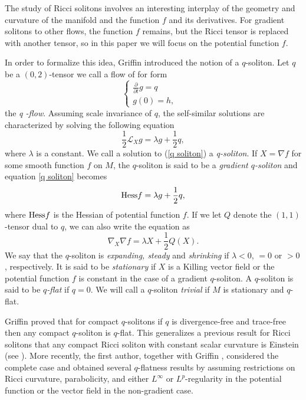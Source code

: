 \documentclass{amsart}
\theoremstyle{plain}
\numberwithin{equation}{section}
\begin{document}
The study of Ricci solitons involves an interesting interplay of the geometry and curvature of the manifold and the function $f$ and its derivatives.  For gradient solitons to other flows, the function $f$ remains, but the Ricci tensor is replaced with another tensor, so in this paper we will focus on the potential function $f$.  

In order to formalize this idea,  Griffin \cite{Griffin} introduced the notion of a $q$-soliton.   Let $q$ be a $(0,2)$-tensor we call a flow of for form
\begin{equation}\label{q flow}
\left\{%
\begin{array}{ll}
\frac{\partial}{\partial t}g=q & \\
g(0)=h,
\end{array}%
\right.
\end{equation}
the {\emph{q -flow}}. Assuming scale invariance of $q$, the self-similar solutions  are characterized by solving the following equation
\begin{equation}\label{q soliton}
\frac{1}{2}\mathcal{L}_Xg=\lambda g+\frac{1}{2}q,
\end{equation}
where $\lambda$ is a constant. We call a solution to (\ref{q soliton}) a \emph{q-soliton}.  If $X=\nabla f$ for some smooth function $f$ on $M$, the $q$-soliton is said to be a {\em gradient $q$-soliton} and equation \eqref{q soliton} becomes
\begin{equation}\label{grad q soliton}
{\rm Hess} f=\lambda g+\frac{1}{2}q,
\end{equation}
where ${\rm Hess} f$ is the Hessian of  potential function $f$. If we  let $Q$ denote the $(1,1)$-tensor dual to $q$, we can also write the equation as
$$\nabla_X \nabla f = \lambda X + \frac{1}{2} Q(X).$$
We say that the $q$-soliton is {\em expanding, steady} and {\em shrinking} if $\lambda < 0$, $= 0$ or $>0$, respectively. It is said to be {\em stationary} if $X$ is a Killing vector field or the potential function $f$ is constant in the case of a gradient $q$-soliton. A $q$-soliton is said to be {\em $q$-flat} if $q = 0$. We will call a $q$-soliton {\em trivial} if $M$ is stationary and $q$-flat.

Griffin \cite{Griffin} proved that for compact $q$-solitons if $q$ is  divergence-free and trace-free  then any compact $q$-soliton is $q$-flat. This generalizes a previous result for Ricci solitons that any compact Ricci soliton with constant scalar curvature is Einstein (see \cite{WP}). More recently, the first author, together with Griffin \cite{Cunha and Griffin}, considered the complete case and obtained several $q$-flatness results by assuming restrictions on Ricci curvature, parabolicity, and either $L^\infty$ or $L^p$-regularity in the potential function or the vector field in the non-gradient case.
\end{document}
